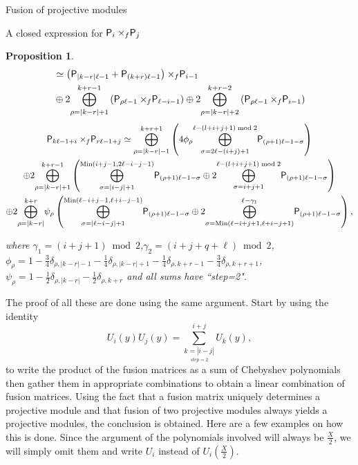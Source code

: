\documentclass[reqno]{amsart}
\newtheorem{Prop}[Thm]{Proposition}
\newcommand{\dP}[1]{\mathsf P_{#1}}
\newcommand{\xf}{\times\hspace{-0.27em}_f}
\newcommand{\U}[1]{U_{#1}}
\newcommand{\lc}{\ell}
\begin{document}
\begin{section}{Fusion of projective modules}
\begin{subsection}{A closed expression for $\dP{i} \xf \dP{j}$}
\begin{Prop}
\begin{align}
&\simeq \left(\dP{|k-r| \lc -1} + \dP{(k+r)\lc-1 }\right) \xf \dP{i-1} \notag \\
& \oplus 2\overset{k+r -1}{\underset{\rho = |k-r|+1}{\bigoplus}}\left(\dP{\rho \lc -1}\xf \dP{\lc - i -1}\right) \oplus 2\overset{k+r -2}{\underset{\rho = |k-r|+2}{\bigoplus}}\left(\dP{\rho \lc -1}\xf \dP{i-1} \right)
\end{align}
\begin{multline}
\dP{k \lc -1+i} \xf \dP{r \lc- 1+j } \simeq \overset{k+r+1}{\underset{\rho = |k-r|-1}{\bigoplus} }\left( 4\phi_{\rho}  \overset{\lc - (l+i+j+1)\bmod{2}}{\underset{\sigma = 2\lc - (i+j)+1}{\bigoplus} } \dP{(\rho+1)\lc -1-\sigma}\right)\\
\oplus 2 \overset{k+r-1}{\underset{\rho = |k-r|+1}{\bigoplus} }\left( \overset{\text{\rm{Min}}(i+j-1,2\lc - i - j -1)}{\underset{\sigma = |i-j| +1}{\bigoplus} }\dP{(\rho + 1)\lc -1 -\sigma} \oplus 2\overset{\lc - (l+i+j+1)\bmod{2}}{\underset{\sigma = i+j +1}{\bigoplus} }\dP{(\rho + 1)\lc -1 -\sigma} \right)\\
\oplus 2 \overset{k+r}{\underset{\rho = |k-r|}{\bigoplus} }\psi_{\rho}\left( \overset{\text{\rm{Min}}(\lc -i+j-1,\lc + i - j -1)}{\underset{\sigma = |\lc-i-j| +1}{\bigoplus} }\dP{(\rho + 1)\lc -1 -\sigma} \oplus2\overset{\lc - \gamma_1}{\underset{\sigma = \text{\rm{Min}}(\lc - i +j +1, \lc+i-j+1)}{\bigoplus} }\dP{(\rho + 1)\lc -1 -\sigma} \right)\text{,}
\end{multline}

\noindent where $\gamma_1 = (i+j+1)\bmod{2}$,$\gamma_2 = (i+j+q+\lc)\bmod{2}$,$\phi_{\rho} = 1 - \frac{3}{4}\delta_{\rho,|k-r|-1} - \frac{1}{4}\delta_{\rho,|k-r|+1} - \frac{1}{4}\delta_{\rho,k+r-1} - \frac{3}{4}\delta_{\rho,k+r+1}$, $\psi_{\rho} = 1- \frac{1}{2} \delta_{\rho,|k-r|} - \frac{1}{2}\delta_{\rho,k+r}$ and all sums have ``step=2".
\end{Prop}
The proof of all these are done using the same argument. Start by using the identity 
$$\U{i}(y)\U{j}(y) = \sum_{\underset{step =2}{k=|i-j|}}^{i+j} \U{k}(y),$$ to write the product of the fusion matrices as a sum of Chebyshev polynomials then gather them in appropriate combinations to obtain a linear combination of fusion matrices. Using the fact that a fusion matrix uniquely determines a projective module and that fusion of two projective modules always yields a projective modules, the conclusion is obtained. Here are a few examples on how this is done. Since the argument of the polynomials involved will always be $\frac{X}{2}$, we will simply omit them and write $\U{i}$ instead of $\U{i}\left(\frac{X}{2}\right)$.


\end{subsection}
\end{section}
\end{document}
